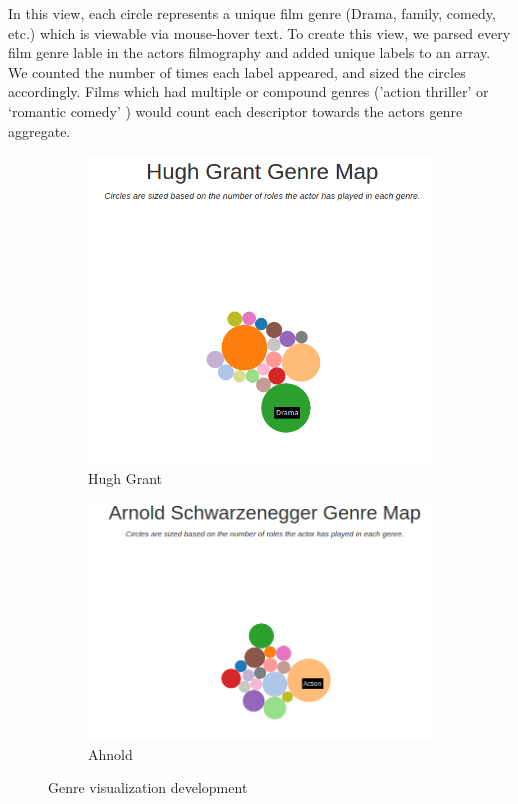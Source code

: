 \documentclass[12pt]{article}
\begin{document}
In this view, each circle represents a unique film genre (Drama, family, comedy, etc.) which is viewable via mouse-hover text.  To create this view, we parsed every film genre lable in the actors filmography and added unique labels to an array.  We counted the number of times each label appeared, and sized the circles accordingly.  Films which had multiple or compound genres ('action thriller' or `romantic comedy' ) would count each descriptor towards the actors genre aggregate.


	\begin{figure}[h!]
		\centering
		\begin{subfigure}[t]{.5\textwidth}
		  \centering
		  \includegraphics[width=\linewidth]{images/HughGrantGenre.png}
		  \caption{ Hugh Grant}
		  \label{fig:HughGrantGenre}
		\end{subfigure}%
		\begin{subfigure}[t]{.8\textwidth}
		  \centering
		  \includegraphics[width=.7\linewidth]{images/ArnoldGenreVis.png}
		  \caption{Ahnold}
		  \label{fig:ArnoldGenre}
		\end{subfigure}%
		\caption{Genre visualization development}
		\label{fig:CharacterGenreVis}
	\end{figure}
\end{document}
